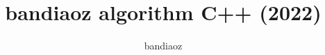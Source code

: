 \documentclass[11pt]{article}
\title{\vspace{-4ex}\Large{bandiaoz algorithm C++ (2022)}}
\author{bandiaoz}
\begin{document}
\begin{landscape}
\begin{multicols*}{2}

\maketitle
\vspace{-13ex}
\tableofcontents
\pagestyle{fancy}



\end{multicols*}
\end{landscape}
\end{document}
